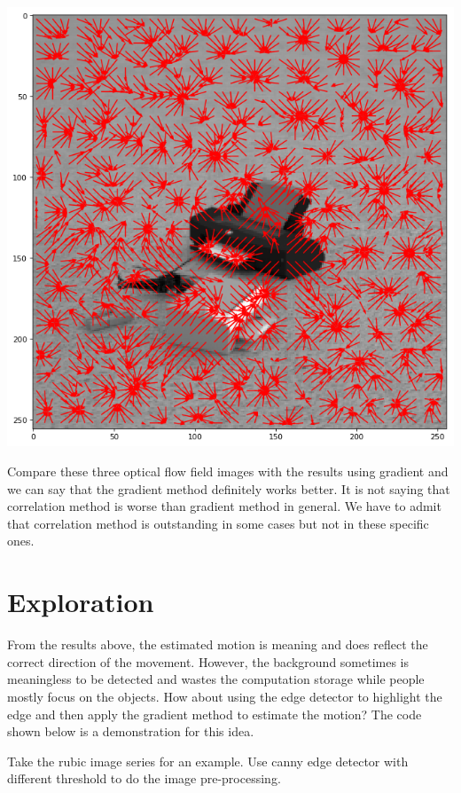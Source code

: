 \documentclass[11pt]{article}
\makeatletter
\def\maxwidth{\ifdim\Gin@nat@width>\linewidth\linewidth
    \else\Gin@nat@width\fi}
\let\Oldincludegraphics\includegraphics
\renewcommand{\includegraphics}[1]{\Oldincludegraphics[width=.8\maxwidth]{#1}}
\makeatother
\begin{document}
\includegraphics{output_17_0.png}

Compare these three optical flow field images with the results using
gradient and we can say that the gradient method definitely works
better. It is not saying that correlation method is worse than gradient
method in general. We have to admit that correlation method is
outstanding in some cases but not in these specific ones.

    \hypertarget{exploration}{%
\section{Exploration}\label{exploration}}

    From the results above, the estimated motion is meaning and does reflect
the correct direction of the movement. However, the background sometimes
is meaningless to be detected and wastes the computation storage while
people mostly focus on the objects. How about using the edge detector to
highlight the edge and then apply the gradient method to estimate the
motion? The code shown below is a demonstration for this idea.

    Take the rubic image series for an example. Use canny edge detector with
different threshold to do the image pre-processing.
\end{document}
